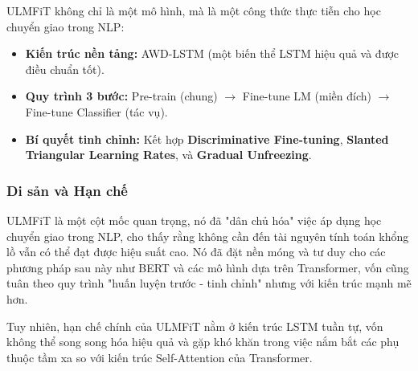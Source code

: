 \begin{tcolorbox}[
    title=Công thức thành công của ULMFiT,
    colback=green!5!white, colframe=green!50!black, fonttitle=\bfseries
]
ULMFiT không chỉ là một mô hình, mà là một công thức thực tiễn cho học chuyển giao trong NLP:
\begin{itemize}
    \item \textbf{Kiến trúc nền tảng:} AWD-LSTM (một biến thể LSTM hiệu quả và được điều chuẩn tốt).
    \item \textbf{Quy trình 3 bước:} Pre-train (chung) $\rightarrow$ Fine-tune LM (miền đích) $\rightarrow$ Fine-tune Classifier (tác vụ).
    \item \textbf{Bí quyết tinh chỉnh:} Kết hợp \textbf{Discriminative Fine-tuning}, \textbf{Slanted Triangular Learning Rates}, và \textbf{Gradual Unfreezing}.
\end{itemize}
\end{tcolorbox}

\subsubsection{Di sản và Hạn chế}
ULMFiT là một cột mốc quan trọng, nó đã "dân chủ hóa" việc áp dụng học chuyển giao trong NLP, cho thấy rằng không cần đến tài nguyên tính toán khổng lồ vẫn có thể đạt được hiệu suất cao. Nó đã đặt nền móng và tư duy cho các phương pháp sau này như BERT và các mô hình dựa trên Transformer, vốn cũng tuân theo quy trình "huấn luyện trước - tinh chỉnh" nhưng với kiến trúc mạnh mẽ hơn.

Tuy nhiên, hạn chế chính của ULMFiT nằm ở kiến trúc LSTM tuần tự, vốn không thể song song hóa hiệu quả và gặp khó khăn trong việc nắm bắt các phụ thuộc tầm xa so với kiến trúc Self-Attention của Transformer.

